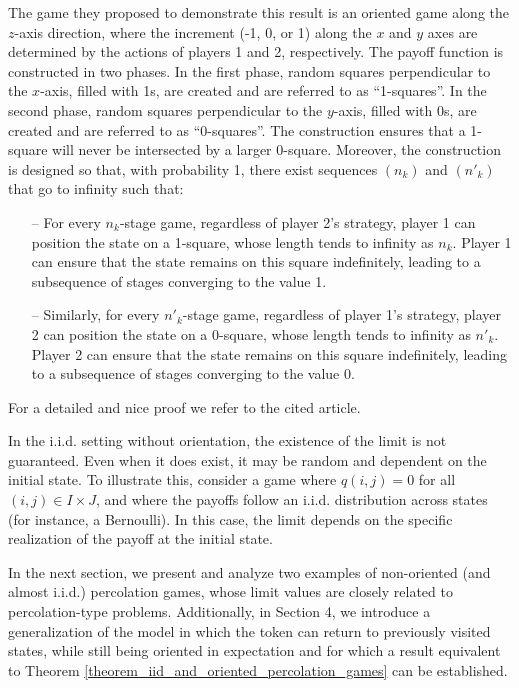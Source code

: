 	The game they proposed to demonstrate this result is an oriented game along the $z$-axis direction, where the increment (-1, 0, or 1) along the $x$ and $y$ axes are determined by the actions of players 1 and 2, respectively. The payoff function is constructed in two phases. In the first phase, random squares perpendicular to the $x$-axis, filled with 1s, are created and are referred to as ``1-squares''. In the second phase, random squares perpendicular to the $y$-axis, filled with 0s, are created and are referred to as ``0-squares''. The construction ensures that a 1-square will never be intersected by a larger 0-square. Moreover, the construction is designed so that, with probability 1, there exist sequences $(n_{k})$ and $(n'_{k})$ that go to infinity such that:
	\begin{itemize} 
		\item[--] For every $n_{k}$-stage game, regardless of player 2's strategy, player 1 can position the state on a 1-square, whose length tends to infinity as $n_{k}$. Player 1 can ensure that the state remains on this square indefinitely, leading to a subsequence of stages converging to the value 1. 
		\item[--] Similarly, for every $n'_{k}$-stage game, regardless of player 1's strategy, player 2 can position the state on a 0-square, whose length tends to infinity as $n'_{k}$. Player 2 can ensure that the state remains on this square indefinitely, leading to a subsequence of stages converging to the value 0.
	\end{itemize}
	For a detailed and nice proof we refer to the cited article.

	In the i.i.d. setting without orientation, the existence of the limit is not guaranteed. Even when it does exist, it may be random and dependent on the initial state. To illustrate this, consider a game where $q(i, j) = 0$ for all $(i, j) \in I \times J$, and where the payoffs follow an i.i.d. distribution across states (for instance, a Bernoulli). In this case, the limit depends on the specific realization of the payoff at the initial state.


	In the next section, we present and analyze two examples of non-oriented (and almost i.i.d.) percolation games, whose limit values are closely related to percolation-type problems. Additionally, in Section 4, we introduce a generalization of the model in which the token can return to previously visited states, while still being oriented in expectation and for which a result equivalent to Theorem \ref{theorem_iid_and_oriented_percolation_games} can be established.
